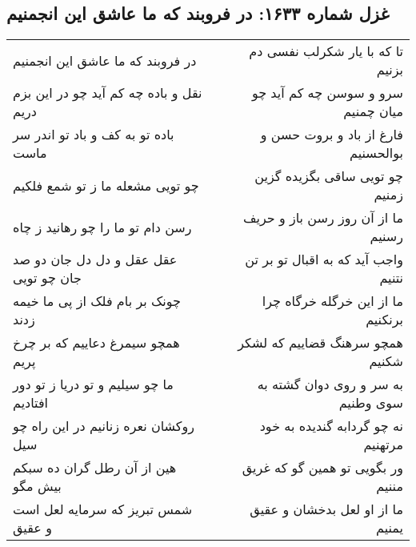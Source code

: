 \begin{center}
\section*{غزل شماره ۱۶۳۳: در فروبند که ما عاشق این انجمنیم}
\label{sec:1633}
\begin{longtable}{l p{0.5cm} r}
در فروبند که ما عاشق این انجمنیم
&&
تا که با یار شکرلب نفسی دم بزنیم
\\
نقل و باده چه کم آید چو در این بزم دریم
&&
سرو و سوسن چه کم آید چو میان چمنیم
\\
باده تو به کف و باد تو اندر سر ماست
&&
فارغ از باد و بروت حسن و بوالحسنیم
\\
چو تویی مشعله ما ز تو شمع فلکیم
&&
چو تویی ساقی بگزیده گزین زمنیم
\\
رسن دام تو ما را چو رهانید ز چاه
&&
ما از آن روز رسن باز و حریف رسنیم
\\
عقل عقل و دل دل جان دو صد جان چو تویی
&&
واجب آید که به اقبال تو بر تن نتنیم
\\
چونک بر بام فلک از پی ما خیمه زدند
&&
ما از این خرگله خرگاه چرا برنکنیم
\\
همچو سیمرغ دعاییم که بر چرخ پریم
&&
همچو سرهنگ قضاییم که لشکر شکنیم
\\
ما چو سیلیم و تو دریا ز تو دور افتادیم
&&
به سر و روی دوان گشته به سوی وطنیم
\\
روکشان نعره زنانیم در این راه چو سیل
&&
نه چو گردابه گندیده به خود مرتهنیم
\\
هین از آن رطل گران ده سبکم بیش مگو
&&
ور بگویی تو همین گو که غریق مننیم
\\
شمس تبریز که سرمایه لعل است و عقیق
&&
ما از او لعل بدخشان و عقیق یمنیم
\\
\end{longtable}
\end{center}
